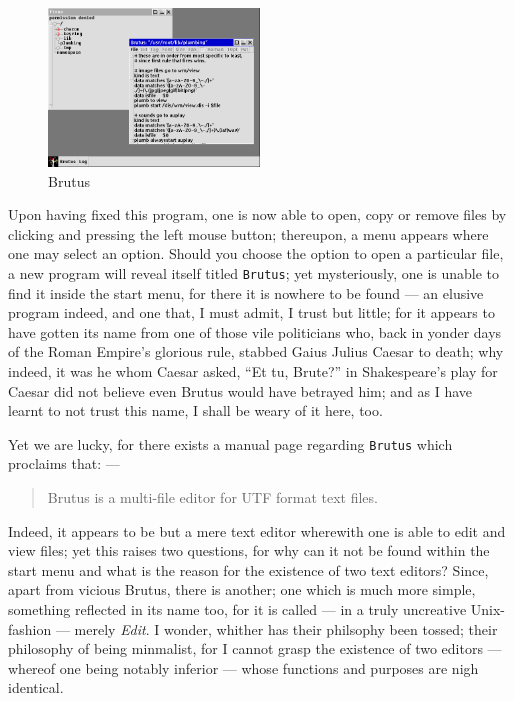 \documentclass[a5paper,twoside,12pt]{report}
\begin{document}
  \begin{figure}
    \centering
    \includegraphics[width=0.5\textwidth]{imgs/brutus.png}
    \caption{Brutus}
  \end{figure}

  Upon having fixed this program, one is now able to open, copy or remove files by clicking and pressing the left mouse button; thereupon, a menu appears where one may select an option. Should you choose the option to open a particular file, a new program will reveal itself titled \texttt{Brutus}; yet mysteriously, one is unable to find it inside the start menu, for there it is nowhere to be found — an elusive program indeed, and one that, I must admit, I trust but little; for it appears to have gotten its name from one of those vile politicians who, back in yonder days of the Roman Empire's glorious rule, stabbed Gaius Julius Caesar to death; why indeed, it was he whom Caesar asked, ``Et tu, Brute?'' in Shakespeare's play for Caesar did not believe even Brutus would have betrayed him; and as I have learnt to not trust this name, I shall be weary of it here, too.
  
  Yet we are lucky, for there exists a manual page regarding \texttt{Brutus} which proclaims that: —

  \begin{quote}
    Brutus is a multi-file editor for UTF format text files.
  \end{quote}

  Indeed, it appears to be but a mere text editor wherewith one is able to edit and view files; yet this raises two questions, for why can it not be found within the start menu and what is the reason for the existence of two text editors? Since, apart from vicious Brutus, there is another; one which is much more simple, something reflected in its name too, for it is called — in a truly uncreative Unix-fashion — merely \textit{Edit}. I wonder, whither has their philsophy been tossed; their philosophy of being minmalist, for I cannot grasp the existence of two editors — whereof one being notably inferior — whose functions and purposes are nigh identical.
\end{document}
